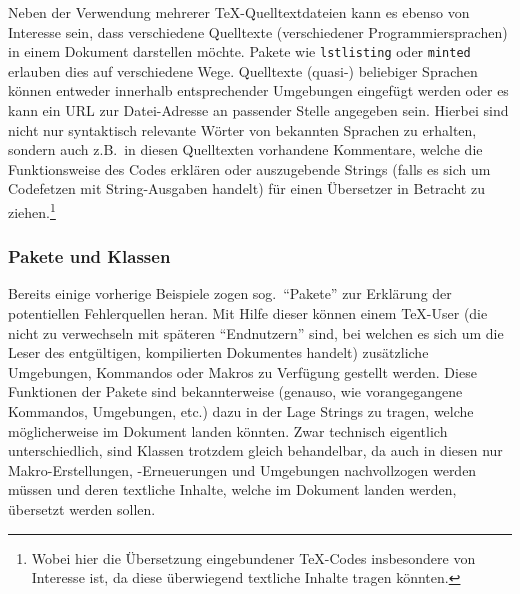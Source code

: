 Neben der Verwendung mehrerer \TeX{}-Quelltextdateien kann es ebenso von Interesse sein, dass verschiedene Quelltexte (verschiedener Programmiersprachen) in einem Dokument darstellen möchte. Pakete wie \texttt{lstlisting} oder \texttt{minted} erlauben dies auf verschiedene Wege. Quelltexte (quasi-) beliebiger Sprachen können entweder innerhalb entsprechender Umgebungen eingefügt werden oder es kann ein URL zur Datei-Adresse an passender Stelle angegeben sein. Hierbei sind nicht nur syntaktisch relevante Wörter von bekannten Sprachen zu erhalten, sondern auch z.B.\ in diesen Quelltexten vorhandene Kommentare, welche die Funktionsweise des Codes erklären oder auszugebende Strings (falls es sich um Codefetzen mit String-Ausgaben handelt) für einen Übersetzer in Betracht zu ziehen.\footnote{Wobei hier die Übersetzung eingebundener \TeX{}-Codes insbesondere von Interesse ist, da diese überwiegend textliche Inhalte tragen könnten.}


\subsubsection{Pakete und Klassen}\par
Bereits einige vorherige Beispiele zogen sog.\ \enquote{Pakete} zur Erklärung der potentiellen Fehlerquellen heran. Mit Hilfe dieser können einem \TeX{}-User (die nicht zu verwechseln mit späteren \enquote{Endnutzern} sind, bei welchen es sich um die Leser des entgültigen, kompilierten Dokumentes handelt) zusätzliche Umgebungen, Kommandos oder Makros zu Verfügung gestellt werden. Diese Funktionen der Pakete sind bekannterweise (genauso, wie vorangegangene Kommandos, Umgebungen, etc.) dazu in der Lage Strings zu tragen, welche möglicherweise im Dokument landen könnten. Zwar technisch eigentlich unterschiedlich, sind Klassen trotzdem gleich behandelbar, da auch in diesen nur Makro-Erstellungen, -Erneuerungen und Umgebungen nachvollzogen werden müssen und deren textliche Inhalte, welche im Dokument landen werden, übersetzt werden sollen.%


